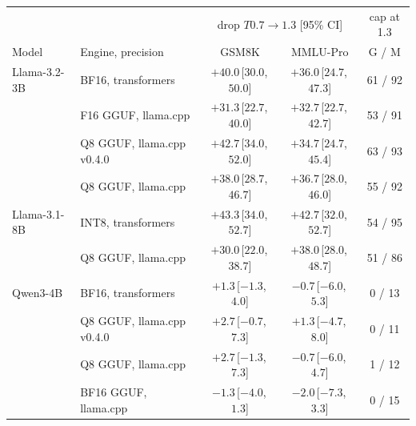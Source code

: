 \begin{tabular}{llccc}
\toprule
 & & \multicolumn{2}{c}{drop $T0.7 \to 1.3$ [95\% CI]} & cap at 1.3 \\
Model & Engine, precision & GSM8K & MMLU-Pro & G / M \\
\midrule
Llama-3.2-3B & BF16, transformers & $+40.0$\,[$30.0$,\,$50.0$] & $+36.0$\,[$24.7$,\,$47.3$] & 61 / 92 \\
 & F16 GGUF, llama.cpp & $+31.3$\,[$22.7$,\,$40.0$] & $+32.7$\,[$22.7$,\,$42.7$] & 53 / 91 \\
 & Q8 GGUF, llama.cpp v0.4.0 & $+42.7$\,[$34.0$,\,$52.0$] & $+34.7$\,[$24.7$,\,$45.4$] & 63 / 93 \\
 & Q8 GGUF, llama.cpp & $+38.0$\,[$28.7$,\,$46.7$] & $+36.7$\,[$28.0$,\,$46.0$] & 55 / 92 \\
\midrule
Llama-3.1-8B & INT8, transformers & $+43.3$\,[$34.0$,\,$52.7$] & $+42.7$\,[$32.0$,\,$52.7$] & 54 / 95 \\
 & Q8 GGUF, llama.cpp & $+30.0$\,[$22.0$,\,$38.7$] & $+38.0$\,[$28.0$,\,$48.7$] & 51 / 86 \\
\midrule
Qwen3-4B & BF16, transformers & $+1.3$\,[$-1.3$,\,$4.0$] & $-0.7$\,[$-6.0$,\,$5.3$] & 0 / 13 \\
 & Q8 GGUF, llama.cpp v0.4.0 & $+2.7$\,[$-0.7$,\,$7.3$] & $+1.3$\,[$-4.7$,\,$8.0$] & 0 / 11 \\
 & Q8 GGUF, llama.cpp & $+2.7$\,[$-1.3$,\,$7.3$] & $-0.7$\,[$-6.0$,\,$4.7$] & 1 / 12 \\
 & BF16 GGUF, llama.cpp & $-1.3$\,[$-4.0$,\,$1.3$] & $-2.0$\,[$-7.3$,\,$3.3$] & 0 / 15 \\
\bottomrule
\end{tabular}
